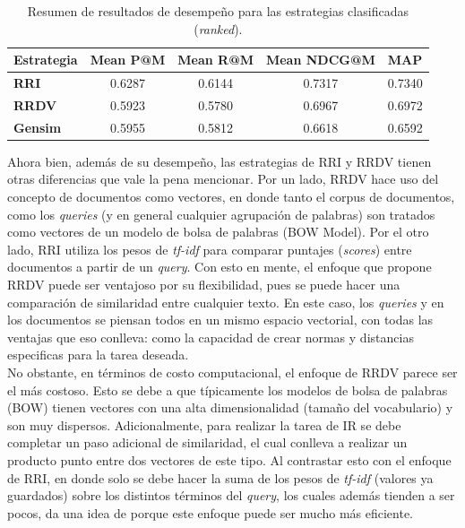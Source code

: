 \begin{table}[H]
\centering
\begin{tabular}{|l|c|c|c|c|}
\hline
\textbf{Estrategia} & \multicolumn{1}{l|}{\textbf{Mean P@M}} & \multicolumn{1}{l|}{\textbf{Mean R@M}} & \multicolumn{1}{l|}{\textbf{Mean NDCG@M}} & \multicolumn{1}{l|}{\textbf{MAP}} \\ \hline
\textbf{RRI} & 0.6287 & 0.6144 & 0.7317 & 0.7340 \\ \hline
\textbf{RRDV} & 0.5923 & 0.5780 & 0.6967 & 0.6972 \\ \hline
\textbf{Gensim} & 0.5955 & 0.5812 & 0.6618 & 0.6592 \\ \hline
\end{tabular}
\caption{Resumen de resultados de desempeño para las estrategias clasificadas (\textit{ranked}).}
\label{tab:rankedResults}
\end{table}

Ahora bien, además de su desempeño, las estrategias de RRI y RRDV tienen otras diferencias que vale la pena mencionar. Por un lado, RRDV hace uso del concepto de documentos como vectores, en donde tanto el corpus de documentos, como los \textit{queries} (y en general cualquier agrupación de palabras) son tratados como vectores de un modelo de bolsa de palabras (BOW Model). Por el otro lado, RRI utiliza los pesos de \textit{tf-idf} para comparar puntajes (\textit{scores}) entre documentos a partir de un \textit{query}. Con esto en mente, el enfoque que propone RRDV puede ser ventajoso por su flexibilidad, pues se puede hacer una comparación de similaridad entre cualquier texto. En este caso, los \textit{queries} y en los documentos se piensan todos en un mismo espacio vectorial, con todas las ventajas que eso conlleva: como la capacidad de crear normas y distancias especificas para la tarea deseada. \\

No obstante, en términos de costo computacional, el enfoque de RRDV parece ser el más costoso. Esto se debe a que típicamente los modelos de bolsa de palabras (BOW) tienen vectores con una alta dimensionalidad (tamaño del vocabulario) y son muy dispersos. Adicionalmente, para realizar la tarea de IR se debe completar un paso adicional de similaridad, el cual conlleva a realizar un producto punto entre dos vectores de este tipo. Al contrastar esto con el enfoque de RRI, en donde solo se debe hacer la suma de los pesos de \textit{tf-idf} (valores ya guardados) sobre los distintos términos del \textit{query}, los cuales además tienden a ser pocos, da una idea de porque este enfoque puede ser mucho más eficiente. \\

